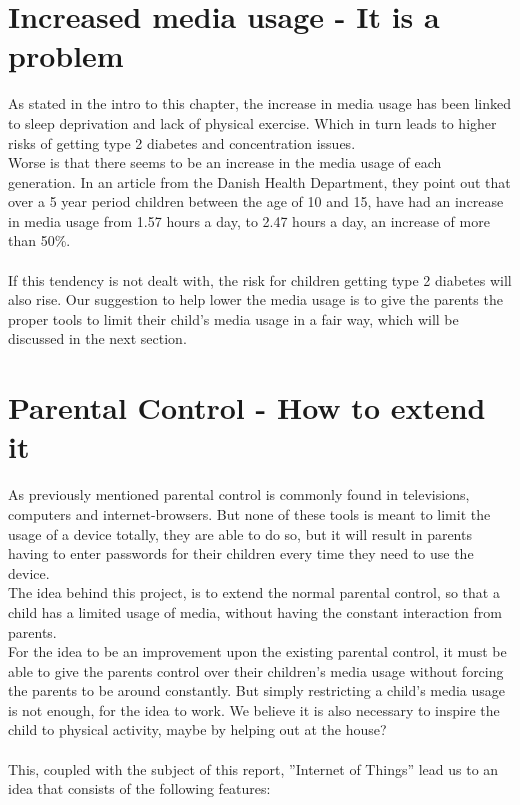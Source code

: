 \section{Increased media usage - It is a problem}
As stated in the intro to this chapter, the increase in media usage has been linked to sleep deprivation and lack of physical exercise. Which in turn leads to higher risks of getting type 2 diabetes and concentration issues.\\
Worse is that there seems to be an increase in the media usage of each generation. In an article from the Danish Health Department, they point out that over a 5 year period children between the age of 10 and 15, have had an increase in media usage from 1.57 hours a day, to 2.47 hours a day, an increase of more than 50\%.\citep{sundhedsstyrelsen}\\
\\
If this tendency is not dealt with, the risk for children getting type 2 diabetes will also rise. Our suggestion to help lower the media usage is to give the parents the proper tools to limit their child’s media usage in a fair way, which will be discussed in the next section.


\section{Parental Control - How to extend it}
\label{section:pcHowToExtend}
As previously mentioned parental control is commonly found in televisions, computers and internet-browsers. But none of these tools is meant to limit the usage of a device totally, they are able to do so, but it will result in parents having to enter passwords for their children every time they need to use the device.\\
The idea behind this project, is to extend the normal parental control, so that a child has a limited usage of media, without having the constant interaction from parents. \\
For the idea to be an improvement upon the existing parental control, it must be able to give the parents control over their children's media usage without forcing the parents to be around constantly. But simply restricting a child's media usage is not enough, for the idea to work. We believe it is also necessary to inspire the child to physical activity, maybe by helping out at the house?\\
\\
This, coupled with the subject of this report, ''Internet of Things'' lead us to an idea that consists of the following features:

